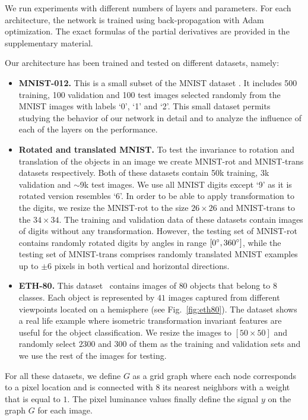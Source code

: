 \documentclass[10pt,journal,compsoc]{IEEEtran}
\begin{document}
	We run experiments with different numbers of layers and parameters. For each architecture, the network is trained using back-propagation with Adam~\cite{bb:adam} optimization. The exact formulas of the partial derivatives are provided in the supplementary material.

	Our architecture has been trained and tested on different datasets, namely:
	\begin{itemize}[topsep=0pt, partopsep=0pt]
		\setlength\itemsep{0pt}
		\setlength{\parskip}{1pt}
		\item \textbf{MNIST-012.}
		This is a small subset of the MNIST dataset \cite{bb:lecun-mnisthandwrittendigit-2010}. It includes 500 training, 100 validation and 100 test images selected randomly from the MNIST images
		with labels `0', `1' and `2'. This small dataset permits studying the behavior of our network in detail and to analyze the influence of each of the layers on the performance.
		\item
		\textbf{Rotated and translated MNIST.}
		To test the invariance to rotation and translation of the objects in an image
		we create MNIST-rot and MNIST-trans datasets respectively.
		Both of these datasets contain 50k training, 3k validation and $\sim$9k test images. We use all MNIST digits \cite{bb:lecun-mnisthandwrittendigit-2010} except `9' as it is rotated version resembles `6'.
		In order to be able to apply transformation to the digits, we resize the MNIST-rot to the size $26 \times 26$ and MNIST-trans to the $34 \times 34$.
		The training and validation data of these datasets contain images of digits without any transformation. However, the testing set of  MNIST-rot contains randomly rotated digits by angles in range $[0\degree, 360\degree]$, while the testing set of MNIST-trans comprises randomly translated MNIST examples up to $\pm 6$ pixels in both vertical and horizontal directions.
		\item
		\textbf{ETH-80.}
		This dataset~\cite{bb:ETH80} contains images of $80$ objects that belong to $8$ classes. Each object is represented by $41$ images captured from different viewpoints located on a hemisphere (see Fig.~\ref{fig:eth80}). The dataset shows a real life example where isometric transformation invariant features are useful for the object classification. We resize the images to $[50 \times 50]$ and randomly select $2300$ and $300$ of them as the training and validation sets and we use the rest of the images for testing.
	\end{itemize}
	\noindent
	For all these datasets, we define $G$ as a grid graph where each node corresponds to a pixel location and is connected with 8 its nearest neighbors with a weight that is equal to $1$. The pixel luminance values finally define the signal $y$ on the graph $G$ for each image.
\end{document}
